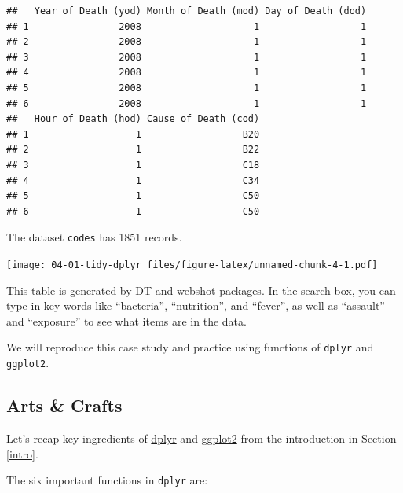 \documentclass[]{book}
\theoremstyle{definition}
\theoremstyle{definition}
\theoremstyle{remark}
\begin{document}
\begin{verbatim}
##   Year of Death (yod) Month of Death (mod) Day of Death (dod)
## 1                2008                    1                  1
## 2                2008                    1                  1
## 3                2008                    1                  1
## 4                2008                    1                  1
## 5                2008                    1                  1
## 6                2008                    1                  1
##   Hour of Death (hod) Cause of Death (cod)
## 1                   1                  B20
## 2                   1                  B22
## 3                   1                  C18
## 4                   1                  C34
## 5                   1                  C50
## 6                   1                  C50
\end{verbatim}

The dataset \texttt{codes} has 1851 records.

\texttt{[image: 04-01-tidy-dplyr\_files/figure-latex/unnamed-chunk-4-1.pdf]}

This table is generated by \href{https://rstudio.github.io/DT/}{DT} and
\href{https://cran.r-project.org/web/packages/webshot/vignettes/intro.html}{webshot}
packages. In the search box, you can type in key words like
``bacteria'', ``nutrition'', and ``fever'', as well as ``assault'' and
``exposure'' to see what items are in the data.

We will reproduce this case study and practice using functions of
\texttt{dplyr} and \texttt{ggplot2}.

\subsection*{Arts \& Crafts}\label{arts-crafts}

Let's recap key ingredients of
\href{http://docs.ggplot2.org/current/}{dplyr} and
\href{http://docs.ggplot2.org/current/}{ggplot2} from the introduction
in Section \ref{intro}.

The six important functions in \texttt{dplyr} are:
\end{document}
